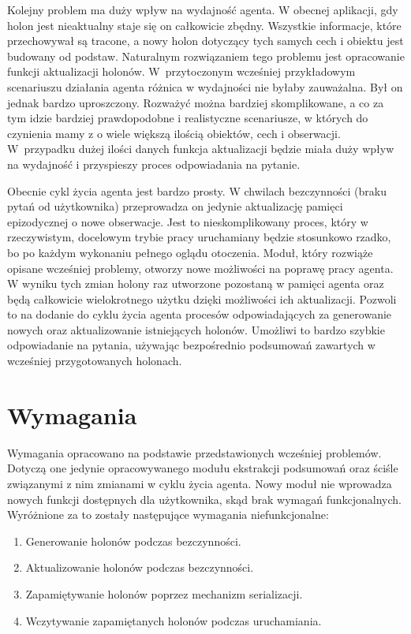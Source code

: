 Kolejny problem ma duży wpływ na wydajność agenta. W obecnej aplikacji, gdy holon jest nieaktualny staje się on całkowicie zbędny. Wszystkie informacje, które przechowywał są tracone, a nowy holon dotyczący tych samych cech i obiektu jest budowany od podstaw. Naturalnym rozwiązaniem tego problemu jest opracowanie funkcji aktualizacji holonów. W~przytoczonym wcześniej przykładowym scenariuszu działania agenta różnica w wydajności nie byłaby zauważalna. Był on jednak bardzo uproszczony. Rozważyć można bardziej skomplikowane, a co za tym idzie bardziej prawdopodobne i realistyczne scenariusze, w których do czynienia mamy z o wiele większą ilością obiektów, cech i obserwacji. W~przypadku dużej ilości danych funkcja aktualizacji będzie miała duży wpływ na wydajność i przyspieszy proces odpowiadania na pytanie.

Obecnie cykl życia agenta jest bardzo prosty. W chwilach bezczynności (braku pytań od użytkownika) przeprowadza on jedynie aktualizację pamięci epizodycznej o nowe obserwacje. Jest to nieskomplikowany proces, który w rzeczywistym, docelowym trybie pracy uruchamiany będzie stosunkowo rzadko, bo po każdym wykonaniu pełnego oglądu otoczenia. Moduł, który rozwiąże opisane wcześniej problemy, otworzy nowe możliwości na poprawę pracy agenta. W wyniku tych zmian holony raz utworzone pozostaną w pamięci agenta oraz będą całkowicie wielokrotnego użytku dzięki możliwości ich aktualizacji. Pozwoli to na dodanie do cyklu życia agenta procesów odpowiadających za generowanie nowych oraz aktualizowanie istniejących holonów. Umożliwi to bardzo szybkie odpowiadanie na pytania, używając bezpośrednio podsumowań zawartych w wcześniej przygotowanych holonach.


\section{Wymagania}

Wymagania opracowano na podstawie przedstawionych wcześniej problemów. Dotyczą one jedynie opracowywanego modułu ekstrakcji podsumowań oraz ściśle związanymi z nim zmianami w cyklu życia agenta. Nowy moduł nie wprowadza nowych funkcji dostępnych dla użytkownika, skąd brak wymagań funkcjonalnych. Wyróżnione za to zostały następujące wymagania niefunkcjonalne:

\begin{enumerate}
	\setlength{\itemindent}{.5in}
	\item Generowanie holonów podczas bezczynności.
	\item Aktualizowanie holonów podczas bezczynności.
	\item Zapamiętywanie holonów poprzez mechanizm serializacji.
	\item Wczytywanie zapamiętanych holonów podczas uruchamiania.
\end{enumerate}  

